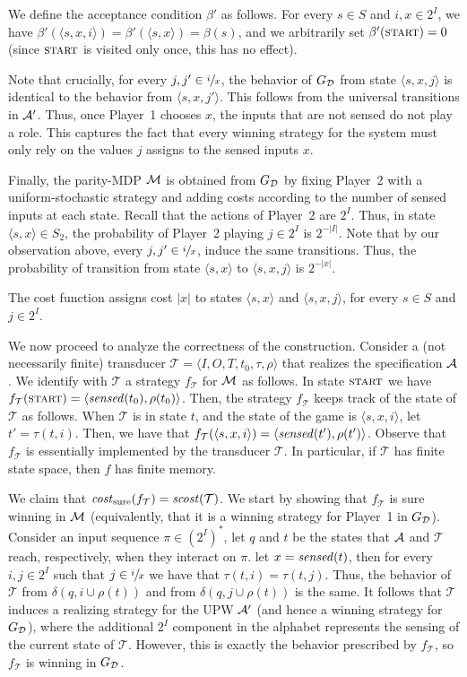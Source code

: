 \documentclass[runningheads,a4paper]{llncs}
\newcommand{\zug}[1]{\langle #1  \rangle}
\newcommand{\T}{{\mathcal T}}
\newcommand{\A}{{\cal A}}
\newcommand{\D}{{\cal D}}
\newcommand{\M}{{\cal M}}
\newcommand{\sen}{{\it sensed}}
\newcommand{\scost}{{\it scost}}
\newcommand{\tIN}{{2^I}}
\newcommand{\tINs}{{{(2^I)}^*}}
\newcommand{\start}{{\textsc{start}}}
\newcommand{\costs}{{\it cost}_{\rm sure}}
\begin{document}
We define the acceptance condition $\beta'$ as follows. For every $s\in S$ and $i,x\in \tIN$, we have $\beta'(\zug{s,x,i})=\beta'(\zug{s,x})=\beta(s)$, and we arbitrarily set $\beta'(\start)=0$ (since $\start$ is visited only once, this has no effect).

Note that crucially, for every $j,j'\in \sfrac{i}{x}$, the behavior of $G_\D$ from state $\zug{s,x,j}$ is identical to the behavior from $\zug{s,x,j'}$. This follows from the universal transitions in $\A'$. Thus, once Player~1 chooses $x$, the inputs that are not sensed do not play a role. This captures the fact that every winning strategy for the system must only rely on the values $j$ assigns to the sensed inputs $x$.

Finally, the parity-MDP $\M$ is obtained from $G_\D$ by fixing Player~2 with a uniform-stochastic strategy and adding costs according to the number of sensed inputs at each state. Recall that the actions of Player~2 are $\tIN$. Thus, in state $\zug{s,x}\in S_2$, the probability of Player~2 playing $j\in \tIN$ is $2^{-|I|}$. Note that by our observation above, every $j,j'\in \sfrac{i}{x}$, induce the same transitions. Thus, the probability of transition from state $\zug{s,x}$ to $\zug{s,x,j}$ is $2^{-|x|}$.

The cost function assigns cost $|x|$ to states $\zug{s,x}$ and $\zug{s,x,j}$, for every $s\in S$ and $j\in \tIN$.

We now proceed to analyze the correctness of the construction. Consider a (not necessarily finite) transducer $\T=\zug{I,O,T,t_0,\tau,\rho}$ that realizes the specification $\A$. We identify with $\T$ a strategy $f_\T$ for $\M$ as follows. 
In state $\start$ we have $f_\T(\start)=\zug{\sen(t_0),\rho(t_0)}$. Then, the strategy $f_\T$ keeps track of the state of $\T$ as follows. When $\T$ is in state $t$, and the state of the game is $\zug{s,x,i}$, let $t'=\tau(t,i)$. Then, we have that $f_\T(\zug{s,x,i})=\zug{\sen(t'),\rho(t')}$. Observe that $f_\T$ is essentially implemented by the transducer $\T$. In particular, if $\T$ has finite state space, then $f$ has finite memory.

We claim that $\costs(f_\T)=\scost(\T)$. We start by showing that $f_\T$ is sure winning in $\M$ (equivalently, that it is a winning strategy for Player~1 in $G_\D$). Consider an input sequence $\pi\in \tINs$, let $q$ and $t$ be the states that $\A$ and $\T$ reach, respectively, when they interact on $\pi$. let $x=\sen(t)$, then for every $i,j\in \tIN$ such that $j\in \sfrac{i}{x}$ we have that $\tau(t,i)=\tau(t,j)$. Thus, the behavior of $\T$ from $\delta(q,i\cup \rho(t))$ and from $\delta(q,j\cup \rho(t))$ is the same. It follows that $\T$ induces a realizing strategy for the UPW $\A'$ (and hence a winning strategy for $G_\D$), where the additional $\tIN$ component in the alphabet represents the sensing of the current state of $\T$. However, this is exactly the behavior prescribed by $f_\T$, so $f_\T$ is winning in $G_\D$. 
\end{document}
